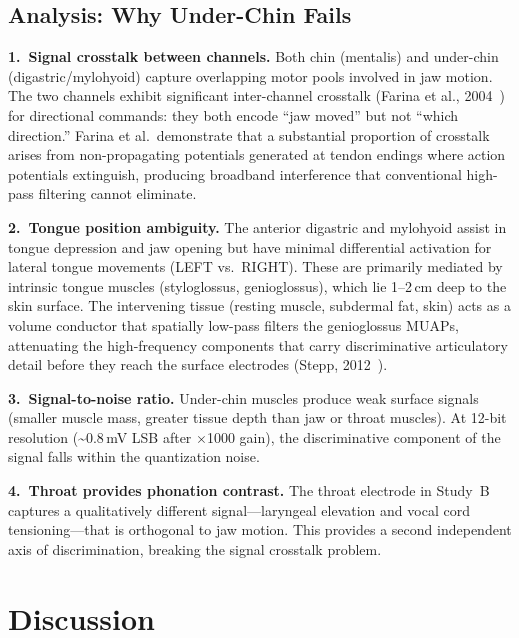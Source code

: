 \documentclass[11pt, a4paper]{article}
\begin{document}
\subsection{Analysis: Why Under-Chin Fails}

\textbf{1.\ Signal crosstalk between channels.} Both chin (mentalis) and under-chin (digastric/mylohyoid) capture overlapping motor pools involved in jaw motion. The two channels exhibit significant inter-channel crosstalk (Farina et al., 2004~\cite{farina2014}) for directional commands: they both encode ``jaw moved'' but not ``which direction.'' Farina et al.\ demonstrate that a substantial proportion of crosstalk arises from non-propagating potentials generated at tendon endings where action potentials extinguish, producing broadband interference that conventional high-pass filtering cannot eliminate.

\textbf{2.\ Tongue position ambiguity.} The anterior digastric and mylohyoid assist in tongue depression and jaw opening but have minimal differential activation for lateral tongue movements (LEFT vs.\ RIGHT). These are primarily mediated by intrinsic tongue muscles (styloglossus, genioglossus), which lie 1--2\,cm deep to the skin surface. The intervening tissue (resting muscle, subdermal fat, skin) acts as a volume conductor that spatially low-pass filters the genioglossus MUAPs, attenuating the high-frequency components that carry discriminative articulatory detail before they reach the surface electrodes (Stepp, 2012~\cite{stepp2012}).

\textbf{3.\ Signal-to-noise ratio.} Under-chin muscles produce weak surface signals (smaller muscle mass, greater tissue depth than jaw or throat muscles). At 12-bit resolution (\textasciitilde0.8\,mV LSB after $\times$1000 gain), the discriminative component of the signal falls within the quantization noise.

\textbf{4.\ Throat provides phonation contrast.} The throat electrode in Study~B captures a qualitatively different signal---laryngeal elevation and vocal cord tensioning---that is orthogonal to jaw motion. This provides a second independent axis of discrimination, breaking the signal crosstalk problem.

\section{Discussion}
\end{document}
